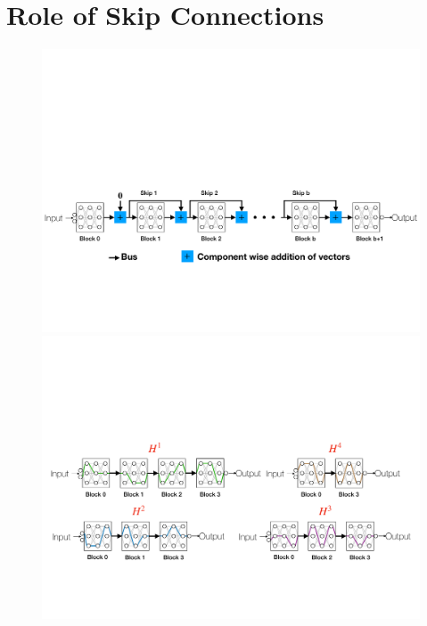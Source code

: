 \section{Role of Skip Connections}

\begin{figure}[t]
\centering
\includegraphics[scale=0.5]{figs/resnet.pdf}
\includegraphics[scale=0.5]{figs/blocks.pdf}
\end{figure}

